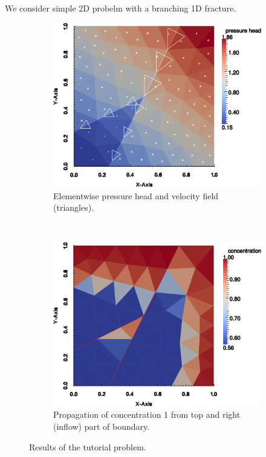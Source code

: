 \documentclass[12pt,a4paper]{report}
\begin{document}
We consider simple 2D probelm with a branching 1D fracture. 

\begin{figure}
    \centering
    \begin{subfigure}[b]{0.45\textwidth}
        \centering
        \includegraphics[scale=0.4]{./03_flow.pdf}
        \caption{Elementwise pressure head and velocity field (triangles).}
    \end{subfigure}
    ~
    \begin{subfigure}[b]{0.45\textwidth}
        \centering
        \includegraphics[scale=0.4]{./03_trans.pdf}
        \caption{Propagation of concentration 1 from top and right (inflow) part of boundary.}
    \end{subfigure}
    \caption{Results of the tutorial problem.}
\end{figure}
\end{document}
